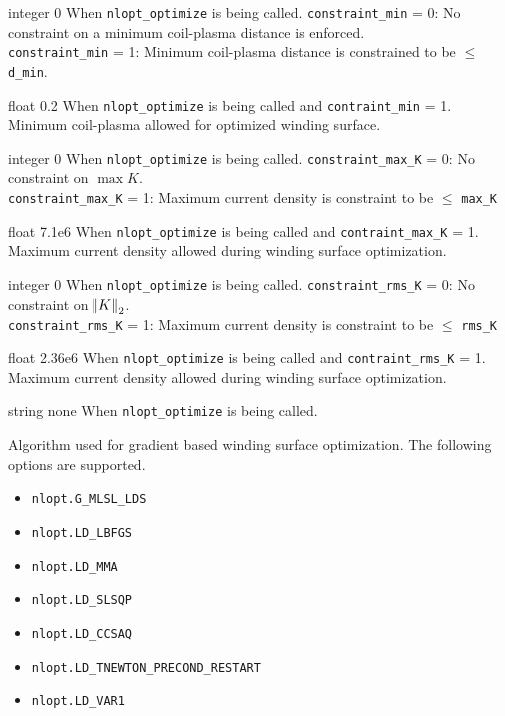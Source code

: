 {integer}
{0}
{When \texttt{nlopt\_optimize} is being called.}
{\texttt{constraint\_min} = 0: No constraint on a minimum coil-plasma distance is enforced. \\
 \texttt{constraint\_min} = 1: Minimum coil-plasma distance is constrained to be $\leq$ \texttt{d\_min}. }
 
\myhrule

{float}
{0.2}
{When \texttt{nlopt\_optimize} is being called and \texttt{contraint\_min} = 1.}
{Minimum coil-plasma allowed for optimized winding surface.}
 
 \myhrule
 
{integer}
{0}
{When \texttt{nlopt\_optimize} is being called.}
{\texttt{constraint\_max\_K} = 0: No constraint on $\max K$. \\
 \texttt{constraint\_max\_K} = 1: Maximum current density is constraint to be $\leq$ \texttt{max\_K}}
 
\myhrule

{float}
{7.1e6}
{When \texttt{nlopt\_optimize} is being called and \texttt{contraint\_max\_K} = 1.}
{Maximum current density allowed during winding surface optimization. }

\myhrule

{integer}
{0}
{When \texttt{nlopt\_optimize} is being called.}
{\texttt{constraint\_rms\_K} = 0: No constraint on $\norm{K}_2$. \\
 \texttt{constraint\_rms\_K} = 1: Maximum current density is constraint to be $\leq$ \texttt{rms\_K}}
 
\myhrule

{float}
{2.36e6}
{When \texttt{nlopt\_optimize} is being called and \texttt{contraint\_rms\_K} = 1.}
{Maximum current density allowed during winding surface optimization. }

\myhrule

{string}
{none}
{When \texttt{nlopt\_optimize} is being called. }
{Algorithm used for gradient based winding surface optimization. The following options are supported.
\begin{itemize}
\item \texttt{nlopt.G\_MLSL\_LDS}
\item \texttt{nlopt.LD\_LBFGS}
\item \texttt{nlopt.LD\_MMA}
\item \texttt{nlopt.LD\_SLSQP} 
\item \texttt{nlopt.LD\_CCSAQ}
\item \texttt{nlopt.LD\_TNEWTON\_PRECOND\_RESTART}
\item \texttt{nlopt.LD\_VAR1}
\end{itemize}
}

